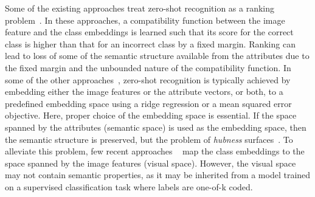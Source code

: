 \documentclass[10pt,twocolumn,letterpaper]{article}
\begin{document}
Some of the existing approaches treat zero-shot recognition as a ranking problem~\cite{akata2016label,xian2016latent,frome2013devise}. In these approaches, a compatibility function between the image feature and the class embeddings is learned such that its score for the correct class is higher than that for an incorrect class by a fixed margin. 
Ranking can lead to loss of some of the semantic structure available from the attributes due to the fixed margin and the unbounded nature of the compatibility function. 
In some of the other approaches~\cite{Kodirov_2017_CVPR,zhang2016learning,romera2015embarrassingly}, zero-shot recognition is typically achieved by embedding either the image features or the attribute vectors, or both, to a predefined embedding space using a ridge regression or a mean squared error objective.
Here, proper choice of the embedding space is essential.
If the space spanned by the attributes (semantic space) is used as the embedding space, then the semantic  structure is preserved, but the problem of \textit{hubness} surfaces~\cite{shigeto2015ridge,radovanovic2010hubs}.
To alleviate this problem, few recent approaches ~\cite{zhang2016learning, shigeto2015ridge} map the class embeddings to  the space spanned by the image features (visual space). 
However, the visual space may not contain semantic properties, as it may be inherited from a model trained on a supervised classification task where labels are one-of-k coded.
\end{document}
